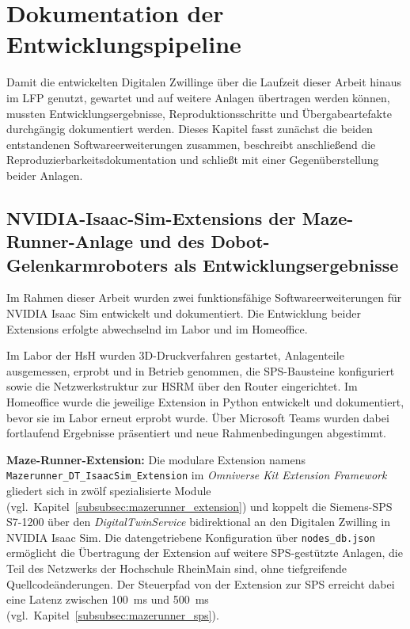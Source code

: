 \section{Dokumentation der Entwicklungspipeline}
\label{sec:ergebnisse}

Damit die entwickelten Digitalen Zwillinge über die Laufzeit dieser Arbeit hinaus im LFP genutzt, gewartet und auf weitere Anlagen übertragen werden können, mussten Entwicklungsergebnisse, Reproduktionsschritte und Übergabeartefakte durchgängig dokumentiert werden. Dieses Kapitel fasst zunächst die beiden entstandenen Softwareerweiterungen zusammen, beschreibt anschließend die Reproduzierbarkeitsdokumentation und schließt mit einer Gegenüberstellung beider Anlagen.

\subsection{NVIDIA-Isaac-Sim-Extensions der Maze-Runner-Anlage und des Dobot-Gelenkarmroboters als Entwicklungsergebnisse}

Im Rahmen dieser Arbeit wurden zwei funktionsfähige Softwareerweiterungen für NVIDIA Isaac Sim entwickelt und dokumentiert.
Die Entwicklung beider Extensions erfolgte abwechselnd im Labor und im Homeoffice.

Im Labor der HsH wurden 3D-Druckverfahren gestartet, Anlagenteile ausgemessen, erprobt und in Betrieb genommen, die SPS-Bausteine konfiguriert sowie die Netzwerkstruktur zur HSRM über den Router eingerichtet.
Im Homeoffice wurde die jeweilige Extension in Python entwickelt und dokumentiert, bevor sie im Labor erneut erprobt wurde.
Über Microsoft Teams wurden dabei fortlaufend Ergebnisse präsentiert und neue Rahmenbedingungen abgestimmt.

\textbf{Maze-Runner-Extension:} Die modulare Extension namens \texttt{Mazerunner\_\allowbreak DT\_\allowbreak IsaacSim\_\allowbreak Extension} im \emph{Omniverse Kit Extension Framework} gliedert sich in zwölf spezialisierte Module (vgl.\ Kapitel~\ref{subsubsec:mazerunner_extension}) und koppelt die Siemens-SPS S7-1200 über den \emph{DigitalTwinService} bidirektional an den Digitalen Zwilling in NVIDIA Isaac Sim. Die datengetriebene Konfiguration über \texttt{nodes\_db.json} ermöglicht die Übertragung der Extension auf weitere SPS-gestützte Anlagen, die Teil des Netzwerks der Hochschule RheinMain sind, ohne tiefgreifende Quellcodeänderungen. Der Steuerpfad von der Extension zur SPS erreicht dabei eine Latenz zwischen \SI{100}{\milli\second} und \SI{500}{\milli\second} (vgl.\ Kapitel~\ref{subsubsec:mazerunner_sps}).

